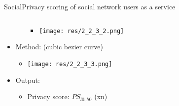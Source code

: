 \begin{frame}{Social}{Privacy scoring of social network users as a service \cite{vidyalakshmi_privacy_2015}}
\begin{columns}
\begin{column}{0.61\textwidth}
\begin{itemize}
\begin{itemize}
\begin{itemize}
								\item[] \texttt{[image: res/2\_2\_3\_2.png]}
							\end{itemize}
					\end{itemize}
							
				\item Method: (cubic bezier curve)
					\begin{itemize}
						\item[] \texttt{[image: res/2\_2\_3\_3.png]}
					\end{itemize}
					

				\item Output:
					\begin{itemize}
						\item Privacy score: $PS_{l0,h0}$ (xn)
					\end{itemize}
					
			\end{itemize}
			
		\end{column}
	\end{columns}
	
\end{frame}

